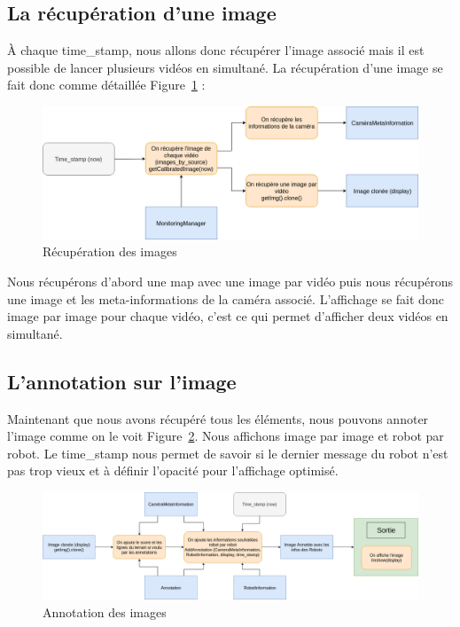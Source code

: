 \subsection{La récupération d'une image}

À chaque time\_stamp, nous allons donc récupérer l'image associé mais il est possible de lancer plusieurs vidéos en simultané. La récupération d'une image se fait donc comme détaillée Figure~\ref{fig:img} : 

\begin{figure}[h] 
\centering 
\includegraphics[scale = 0.3]{images/image.png}
    \caption{Récupération des images}
    \label{fig:img}
\end{figure} 

Nous récupérons d'abord une map avec une image par vidéo puis nous récupérons une image et les meta-informations de la caméra associé. L'affichage se fait donc image par image pour chaque vidéo, c'est ce qui permet d'afficher deux vidéos en simultané.

\subsection{L'annotation sur l'image}

Maintenant que nous avons récupéré tous les éléments, nous pouvons annoter l'image comme on le voit Figure~\ref{fig:annot}. Nous affichons image par image et robot par robot. Le time\_stamp nous permet de savoir si le dernier message du robot n'est pas trop vieux et à définir l'opacité pour l'affichage optimisé.

\begin{figure}[h] 
\centering 
\includegraphics[scale = 0.27]{images/annotation.png}
    \caption{Annotation des images}
    \label{fig:annot}
\end{figure} 

